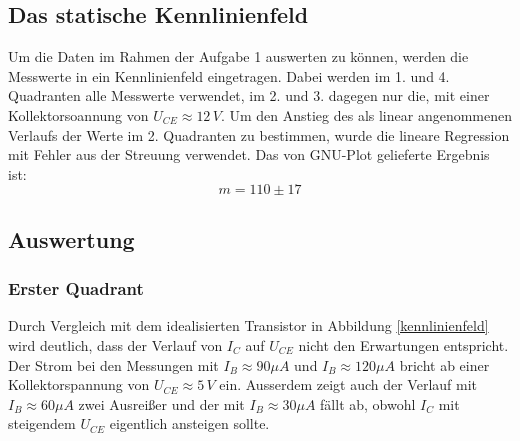 \subsection{Das statische Kennlinienfeld}
Um die Daten im Rahmen der Aufgabe 1 auswerten zu können, werden die Messwerte in ein Kennlinienfeld eingetragen. Dabei werden im 1. und 4. Quadranten alle Messwerte verwendet, im 2. und 3. dagegen nur die, mit einer Kollektorsoannung von \(U_{CE} \approx 12\,V \). Um den Anstieg des als linear angenommenen Verlaufs der Werte im 2. Quadranten zu bestimmen, wurde die lineare Regression mit Fehler aus der Streuung verwendet. Das von GNU-Plot gelieferte Ergebnis ist:
\begin{equation}
m = 110 \pm 17
\end{equation}
\begin{center}
\begin{minipage}{\linewidth}
\centering
{}
%
\label{gnuplot_kennlinienfeld}
\end{minipage}
\end{center}

\subsection{Auswertung}
\subsubsection{Erster Quadrant}
Durch Vergleich mit dem idealisierten Transistor in Abbildung \ref{kennlinienfeld} wird deutlich, dass der Verlauf von \(I_C\) auf \(U_{CE}\) nicht den Erwartungen entspricht. Der Strom bei den Messungen mit \(I_B \approx 90 \mu A\) und \(I_B \approx 120 \mu A\) bricht ab einer Kollektorspannung von \(U_{CE} \approx 5\, V\) ein. Ausserdem zeigt auch der Verlauf mit \(I_B \approx 60 \mu A\) zwei Ausreißer und der mit \(I_B \approx 30 \mu A\) fällt ab, obwohl \(I_C\) mit steigendem \(U_{CE}\) eigentlich ansteigen sollte.

